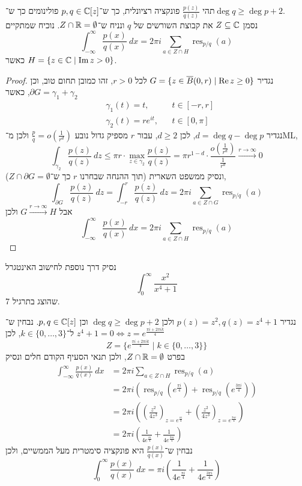\question{}
\subquestion{}
תהי $\frac{p(z)}{q(z)}$ פונקציה רציונלית, כך ש־$p, q \in \mathbb{C}[z]$ פולינומים כך ש־$\deg q \ge \deg p + 2$. \\
נסמן $Z \subseteq \mathbb{C}$ את קבוצת השורשים של $q$ ונניח ש־$Z \cap \mathbb{R} = \emptyset$.
נוכיח שמתקיים
\[
	\int_{-\infty}^{\infty} \frac{p(x)}{q(x)}\ dx
	= 2\pi i \sum_{a \in Z \cap H} \operatorname{res}_{p/q}(a)
\]
כאשר $H = \{ z \in \mathbb{C} \mid \operatorname{Im} z > 0 \}$.
\begin{proof}
	נגדיר $G = \{ z \in \overline{B}(0, r) \mid \operatorname{Re} z \ge 0 \}$ לכל $r > 0$, זהו כמובן תחום טוב, וכן $\partial G = \gamma_1 + \gamma_2$, כאשר
	\begin{align*}
		& \gamma_1(t) = t, && t \in [-r, r] \\
		& \gamma_2(t) = r e^{it}, && t \in [0, \pi]
	\end{align*}
	נגדיר $d = \deg q - \deg p$, לכן $d \ge 2$, עבור $r$ מספיק גדול נובע $\frac{p}{q} = o(\frac{1}{r^d})$ ולכן מ־ML,
	\[
		\int_{\gamma_2} \frac{p(z)}{q(z)}\ dz
		\le \pi r \cdot \max_{z \in \gamma_2} \frac{p(z)}{q(z)}
		= \pi r^{1 - d} \cdot \frac{o(\frac{1}{r^d})}{\frac{1}{r^d}}
		\xrightarrow{r \to \infty} 0
	\]
	ונסיק ממשפט השארית (תוך ההנחה שבחרנו $r$ כך ש־$Z \cap \partial G = \emptyset$),
	\[
		\int_{\partial G} \frac{p(z)}{q(z)}\ dz
		= \int_{-r}^r \frac{p(z)}{q(z)}\ dz
		= 2\pi i \sum_{a \in Z \cap G} \operatorname{res}_{p/q}(a)
	\]
	אבל $G \xrightarrow{r \to \infty} H$ ולכן
	\[
		\int_{-\infty}^{\infty} \frac{p(x)}{q(x)}\ dx
		= 2\pi i \sum_{a \in Z \cap H} \operatorname{res}_{p/q}(a)
	\]
\end{proof}

\subquestion{}
נסיק דרך נוספת לחישוב האינטגרל
\[
	\int_0^\infty \frac{x^2}{x^4 + 1}
\]
שהוצג בתרגיל 7.
\begin{solution}
	נגדיר $p(z) = z^2, q(z) = z^4 + 1$ ולכן $\deg q \ge \deg p + 2$ וכן $p, q \in \mathbb{C}[z]$.
	נבחין ש־$z^4 + 1 = 0 \iff z = e^{\frac{\pi i + 2\pi i k}{4}}$ ל־$k \in \{0, \dots, 3\}$, לכן
	\[
		Z = \{ e^{\frac{\pi i + 2\pi i k}{4}} \mid k \in \{0, \dots, 3\} \}
	\]
	בפרט $Z \cap \mathbb{R} = \emptyset$, ולכן תנאי הסעיף הקודם חלים ונסיק
	\begin{align*}
		\int_{-\infty}^{\infty} \frac{p(x)}{q(x)}\ dx
		& = 2\pi i \sum_{a \in Z \cap H} \operatorname{res}_{p/q}(a) \\
		& = 2\pi i (\operatorname{res}_{p/q}(e^{\frac{\pi i}{4}}) + \operatorname{res}_{p/q}(e^{\frac{3 \pi i}{4}})) \\
		& = 2\pi i \left({\left( \frac{z^2}{4z^3} \right)}_{z = e^{\frac{\pi i}{4}}} + {\left( \frac{z^2}{4z^3} \right)}_{z = e^{\frac{3 \pi i}{4}}}\right) \\
		& = 2\pi i \left(\frac{1}{4e^{\frac{\pi i}{4}}} + \frac{1}{4e^{\frac{3 \pi i}{4}}} \right)
	\end{align*}
	נבחין ש־$\frac{p(x)}{q(x)}$ היא פונקציה סימטרית מעל הממשיים, ולכן
	\[
		\int_0^{\infty} \frac{p(x)}{q(x)}\ dx
		= \pi i \left(\frac{1}{4e^{\frac{\pi i}{4}}} + \frac{1}{4e^{\frac{3 \pi i}{4}}} \right)
	\]
\end{solution}


